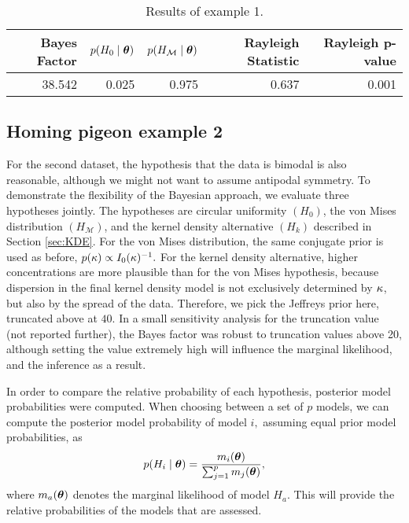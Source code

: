 \begin{table}[b]
\centering
\caption{Results of example 1. } 
\label{tab:ex1}
\begin{tabular}{rrrrr}
  \hline
Bayes Factor & $p(H_0  \mid \boldsymbol{\theta})$ & $p(H_\mathcal{M} \mid \boldsymbol{\theta})$ & Rayleigh Statistic & Rayleigh  p-value \\ 
  \hline
38.542 & 0.025 & 0.975 & 0.637 & 0.001 \\ 
   \hline
\end{tabular}
\end{table}




\subsection{Homing pigeon example 2} \label{sec:ex2}





For the second dataset, the hypothesis that the data is bimodal is also reasonable, although we might not want to assume antipodal symmetry. To demonstrate the flexibility of the Bayesian approach, we evaluate three hypotheses jointly. The hypotheses are circular uniformity \((H_0)\), the von Mises distribution \((H_\mathcal{M})\), and the kernel density alternative \((H_k)\) described in Section \ref{sec:KDE}. For the von Mises distribution, the same conjugate prior is used as before, \( p(\kappa) \propto I_0(\kappa)^{-1}.\) For the kernel density alternative, higher concentrations are more plausible than for the von Mises hypothesis, because dispersion in the final kernel density model is not exclusively determined by \( \kappa \), but also by the spread of the data. Therefore, we pick the Jeffreys prior here, truncated above at \( 40.\) In a small sensitivity analysis for the truncation value (not reported further), the Bayes factor was robust to truncation values above 20, although setting the value extremely high will influence the marginal likelihood, and the inference as a result.

In order to compare the relative probability of each hypothesis, posterior model probabilities were computed. When choosing between a set of \( p \) models, we can compute the posterior model probability of model \( i,\) assuming equal prior model probabilities, as
\begin{equation}
p(H_i \mid \boldsymbol{\theta}) = \frac{m_i(\boldsymbol{\theta})}{\sum_{j = 1}^p m_j(\boldsymbol{\theta})},
\end{equation}
where \( m_a(\boldsymbol{\theta})\) denotes the marginal likelihood of model \( H_a.\) This will provide the relative probabilities of the models that are assessed.

